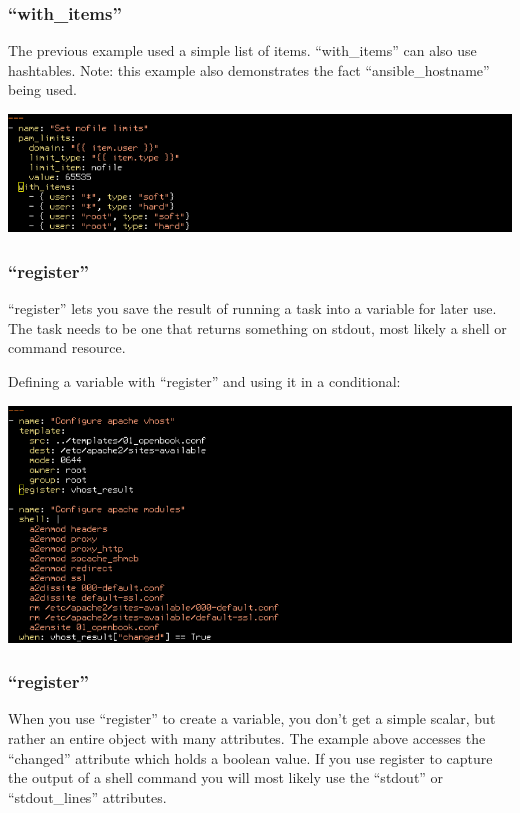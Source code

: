 \documentclass[helvetica,english,utf8,notitle,nologo]{beamer}
\begin{document}
\begin{frame}
  \frametitle{``with\_items''}

  The previous example used a simple list of items. ``with\_items''
  can also use hashtables. Note: this example also demonstrates the
  fact ``ansible\_hostname'' being used.

  \includegraphics[scale=0.34]{img_13}
\end{frame}

\begin{frame}
  \frametitle{``register''}

  ``register'' lets you save the result of running a task into a
  variable for later use. The task needs to be one that returns
  something on stdout, most likely a shell or command resource.

  Defining a variable with ``register'' and using it in a conditional:

  \includegraphics[scale=0.34]{img_15}
\end{frame}

\begin{frame}
  \frametitle{``register''}

  When you use ``register'' to create a variable, you don't get a
  simple scalar, but rather an entire object with many attributes. The
  example above accesses the ``changed'' attribute which holds a
  boolean value. If you use register to capture the output of a shell
  command you will most likely use the ``stdout'' or ``stdout\_lines''
  attributes.
\end{frame}
\end{document}
